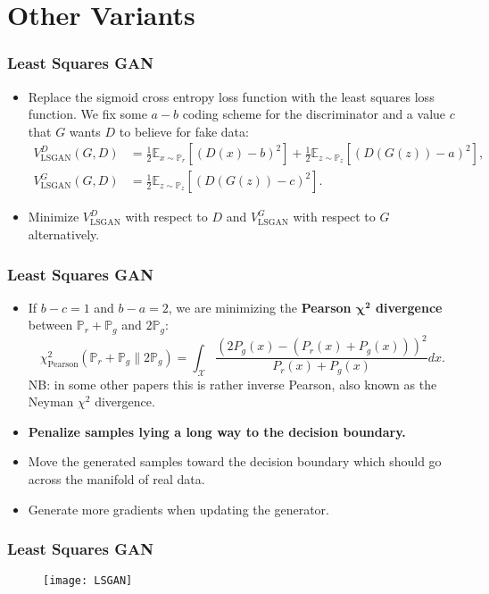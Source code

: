 \section{Other Variants}

\begin{frame}
  \frametitle{Least Squares GAN}
  \begin{itemize}
    \item Replace the sigmoid cross entropy loss function with the least
      squares loss function. We fix some $a-b$ coding scheme for the
      discriminator and a value $c$ that $G$ wants $D$ to believe for fake
      data:
      \begin{align*}
        V_{\mathrm{LSGAN}}^D(G, D)
        & = \frac{1}{2} \mathbb{E}_{x\sim\mathbb{P}_r}[(D(x)-b)^2]
        + \frac{1}{2} \mathbb{E}_{z\sim\mathbb{P}_z}[(D(G(z))-a)^2],\\
        V_{\mathrm{LSGAN}}^G(G, D)
        & = \frac{1}{2} \mathbb{E}_{z\sim\mathbb{P}_z}[(D(G(z))-c)^2].
      \end{align*}
    \item Minimize $V_{\mathrm{LSGAN}}^D$ with respect to $D$ and
      $V_{\mathrm{LSGAN}}^G$ with respect to $G$ alternatively.
  \end{itemize}
\end{frame}

\begin{frame}
  \frametitle{Least Squares GAN}
  \begin{itemize}
    \item If $b-c=1$ and $b-a=2$, we are minimizing the \textbf{Pearson
      $\mathbf{\chi^2}$ divergence} between
      $\mathbb{P}_r+\mathbb{P}_g$ and $2\mathbb{P}_g$:
      \[
        \chi_{\mathrm{Pearson}}^2(\mathbb{P}_r+\mathbb{P}_g\|2\mathbb{P}_g)
        = \int_{\mathcal{X}}
          \frac{(2P_g(x)-(P_r(x)+P_g(x)))^2}{P_r(x)+P_g(x)}dx.
      \]
      NB: in some other papers this is rather inverse Pearson,
      also known as the Neyman $\chi^2$ divergence.
    \item \textbf{Penalize samples lying a long way to the decision boundary.}
    \item Move the generated samples toward the decision boundary which should
      go across the manifold of real data.
    \item Generate more gradients when updating the generator.
  \end{itemize}
\end{frame}

\begin{frame}
  \frametitle{Least Squares GAN}
    \begin{figure}
      \texttt{[image: LSGAN]}
    \end{figure}
\end{frame}

